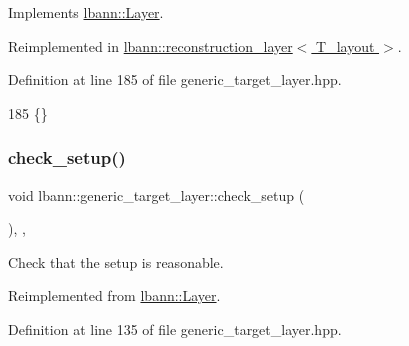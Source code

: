 Implements \hyperlink{classlbann_1_1Layer_a7442e01f9ee1294df2de811efcf5171e}{lbann\+::\+Layer}.



Reimplemented in \hyperlink{classlbann_1_1reconstruction__layer_a58408a14bfe5212b12243640ed284744}{lbann\+::reconstruction\+\_\+layer$<$ T\+\_\+layout $>$}.



Definition at line 185 of file generic\+\_\+target\+\_\+layer.\+hpp.


\begin{DoxyCode}
185 \{\}
\end{DoxyCode}
\mbox{\label{classlbann_1_1generic__target__layer_a35375f4cf914ba5a308fdbd98c589408}} 
\subsubsection{\texorpdfstring{check\+\_\+setup()}{check\_setup()}}
{\footnotesize\ttfamily void lbann\+::generic\+\_\+target\+\_\+layer\+::check\+\_\+setup (\begin{DoxyParamCaption}{ }\end{DoxyParamCaption})\hspace{0.3cm}{\ttfamily [inline]}, {\ttfamily [override]}, {\ttfamily [virtual]}}

Check that the setup is reasonable. 

Reimplemented from \hyperlink{classlbann_1_1Layer_aeec1c710c3d53b5e43a4d4f67b0a21b2}{lbann\+::\+Layer}.



Definition at line 135 of file generic\+\_\+target\+\_\+layer.\+hpp.


